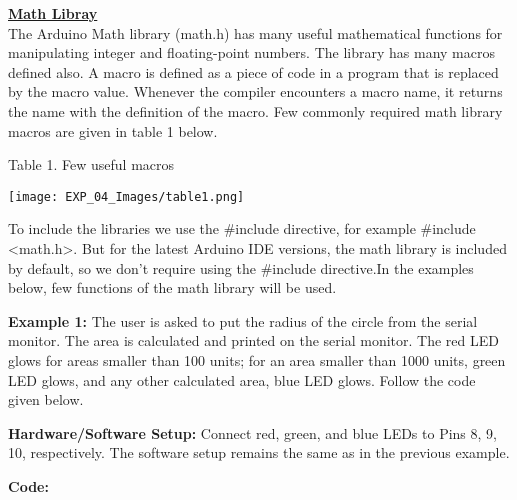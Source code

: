 \documentclass[12pt,a4paper]{article}
\begin{document}
\setlength{\parindent}{0eM}
\begin{justify}
\textbf{\underline{Math Libray}}\\
The Arduino Math library (math.h) has many useful mathematical functions for manipulating integer and floating-point numbers. The library has many macros defined also. A macro is defined as a piece of code in a program that is replaced by the macro value. Whenever the compiler encounters a macro name, it returns the name with the definition of the macro. Few commonly required math library macros are given in table 1 below.

\begin{center}{Table 1. Few useful macros}\end{center}
\vspace{-3mm}
\begin{center} 
\texttt{[image: EXP\_04\_Images/table1.png]}
\end{center}

\noindent To include the libraries we use the \#include directive, for example \#include <math.h>. But for the latest Arduino IDE versions, the math library is included by default, so we don't require using the \#include directive.In the examples below, few functions of the math library will be used.\par 
\noindent \textbf{Example 1:} The user is asked to put the radius of the circle from the serial monitor. The area is calculated and printed on the serial monitor. The red LED glows for areas smaller than 100 units; for an area smaller than 1000 units, green LED glows, and any other calculated area, blue LED glows. Follow the code given below.\par
\noindent \textbf{Hardware/Software Setup:} Connect red, green, and blue LEDs to Pins 8, 9, 10, respectively. The software setup remains the same as in the previous example.
\end{justify}

\vspace{-5mm}
\hspace{1.5cm}\textbf{\large Code:}\\[6pt]
\setlength{\parindent}{8eM}
\end{document}

